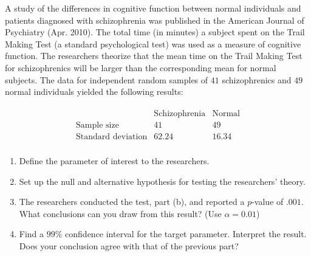 
\begin{exercise}

A study of the differences in cognitive function between normal individuals and patients diagnosed with schizophrenia was published in the American Journal of Psychiatry (Apr. 2010).
The total time (in minutes) a subject spent on the Trail Making Test (a standard psychological test) was used as a measure of cognitive function.
The researchers theorize that the mean time on the Trail Making Test for schizophrenics will be larger than the corresponding mean for normal subjects.
The data for independent random samples of $41$ schizophrenics and $49$ normal individuals yielded the following results:

\begin{align*}
    \begin{array}{l|cc}
                                  & \text{Schizophrenia} & \text{Normal} \\ \hline
        \text{Sample size}        & 41                   & 49            \\
        \text{Standard deviation} & 62.24                & 16.34         \\
    \end{array}
\end{align*}

\begin{enumerate}[label = (\alph*)]
    
    \item Define the parameter of interest to the researchers.
    
    \item Set up the null and alternative hypothesis for testing the researchers’ theory.
    
    \item The researchers conducted the test, part (b), and reported a $p$-value of $.001$.
    What conclusions can you draw from this result?
    (Use $\alpha = 0.01$)
    
    \item Find a $99 \%$ confidence interval for the target parameter.
    Interpret the result.
    Does your conclusion agree with that of the previous part?

\end{enumerate}

\end{exercise}


\begin{solution}

\phantom{}

\end{solution}

